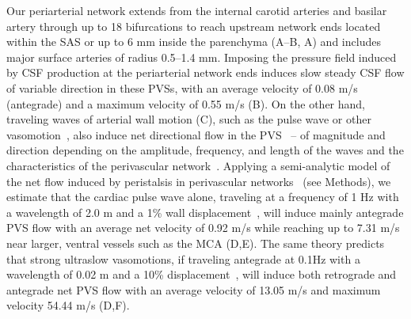 \documentclass[fleqn,10pt]{wlscirep}
\begin{document}
Our periarterial network extends from the internal carotid arteries
and basilar artery through up to 18 bifurcations to reach upstream
network ends located within the SAS or up to 6 mm inside the
parenchyma (A--B, A) and includes
major surface arteries of radius 0.5--1.4 mm. Imposing the pressure
field induced by CSF production at the periarterial network ends
induces slow steady CSF flow of variable direction in these PVSs, with
an average velocity of 0.08 \textmu m/s (antegrade) and a maximum
velocity of 0.55 \textmu m/s (B). On the other hand,
traveling waves of arterial wall motion (C), such as
the pulse wave or other vasomotion~\cite{vanveluw2020vasomotion,
  munting2023spontaneous, bojarskaite2023sleep,
  broggini2024long,hauglund2025norepinephrine}, also induce net
directional flow in the PVS~\cite{kedarasetti2020arterial,
  kedarasetti2020functional, coenen2021lubrication,
  gjerde2023directional, nozaleda2024arterial} -- of magnitude and
direction depending on the amplitude, frequency, and length of the
waves and the characteristics of the perivascular
network~\cite{gjerde2023directional}. Applying a semi-analytic model
of the net flow induced by peristalsis in perivascular
networks~\cite{gjerde2023directional} (see Methods), we estimate that
the cardiac pulse wave alone, traveling at a frequency of 1 Hz with a
wavelength of 2.0 m and a 1\% wall displacement~\cite{jung2021novel},
will induce mainly antegrade PVS flow with an average net velocity of
0.92 \textmu m/s while reaching up to 7.31 \textmu m/s near larger,
ventral vessels such as the MCA (D,E). The same theory
predicts that strong ultraslow vasomotions, if traveling antegrade at
0.1Hz with a wavelength of 0.02 m and a 10\%
displacement~\cite{broggini2024long}, will induce both retrograde and
antegrade net PVS flow with an average velocity of 13.05 \textmu m/s
and maximum velocity 54.44 \textmu m/s (D,F).
\end{document}

